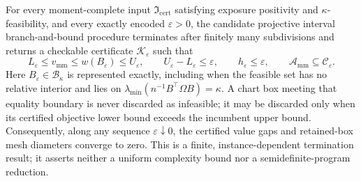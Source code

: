 For every moment-complete input \(\mathfrak I_{\mathrm{cert}}\) satisfying exposure positivity and \(\kappa\)-feasibility, and every exactly encoded \(\varepsilon>0\), the candidate projective interval branch-and-bound procedure terminates after finitely many subdivisions and returns a checkable certificate \(\mathscr K_{\varepsilon}\) such that
\[
L_{\varepsilon}\le v_{\mathrm{mm}}\le w(B_{\varepsilon})\le U_{\varepsilon},
\qquad
U_{\varepsilon}-L_{\varepsilon}\le\varepsilon,
\qquad
h_{\varepsilon}\le\varepsilon,
\qquad
\mathcal A_{\mathrm{mm}}\subseteq\mathcal C_{\varepsilon}.
\]
Here \(B_{\varepsilon}\in\mathcal B_\kappa\) is represented exactly, including when the feasible set has no relative interior and lies on \(\lambda_{\min}(n^{-1}B^{\top}\Omega B)=\kappa\).  A chart box meeting that equality boundary is never discarded as infeasible; it may be discarded only when its certified objective lower bound exceeds the incumbent upper bound.  Consequently, along any sequence \(\varepsilon\downarrow0\), the certified value gaps and retained-box mesh diameters converge to zero.  This is a finite, instance-dependent termination result; it asserts neither a uniform complexity bound nor a semidefinite-program reduction.